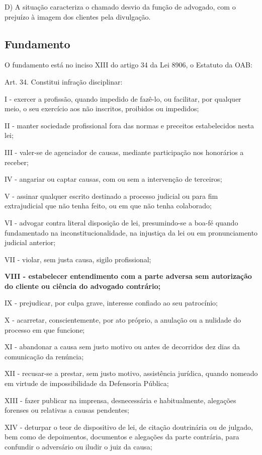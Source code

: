 \documentclass[12pt]{article}
\begin{document}
D) A situação caracteriza o chamado desvio da função de 
advogado, com o prejuízo à imagem dos clientes pela 
divulgação. 

\subsection{Fundamento}

O fundamento está no inciso XIII do artigo 34 da Lei 8906, o Estatuto da OAB:

Art. 34. Constitui infração disciplinar:

I - exercer a profissão, quando impedido de fazê-lo, ou facilitar, por qualquer meio, o seu exercício aos não inscritos, proibidos ou impedidos;

II - manter sociedade profissional fora das normas e preceitos estabelecidos nesta lei;

III - valer-se de agenciador de causas, mediante participação nos honorários a receber;

IV - angariar ou captar causas, com ou sem a intervenção de terceiros;

V - assinar qualquer escrito destinado a processo judicial ou para fim extrajudicial que não tenha feito, ou em que não tenha     colaborado;

VI - advogar contra literal disposição de lei, presumindo-se a boa-fé quando fundamentado na inconstitucionalidade, na injustiça da lei ou em pronunciamento judicial anterior;

VII - violar, sem justa causa, sigilo profissional;

\textbf{VIII - estabelecer entendimento com a parte adversa sem autorização do cliente ou ciência do advogado contrário;}

IX - prejudicar, por culpa grave, interesse confiado ao seu patrocínio;

X - acarretar, conscientemente, por ato próprio, a anulação ou a nulidade do processo em que funcione;

XI - abandonar a causa sem justo motivo ou antes de decorridos dez dias da comunicação da renúncia;

XII - recusar-se a prestar, sem justo motivo, assistência jurídica, quando nomeado em virtude de impossibilidade da Defensoria Pública;

XIII - fazer publicar na imprensa, desnecessária e habitualmente, alegações forenses ou relativas a causas pendentes;

XIV - deturpar o teor de dispositivo de lei, de citação doutrinária ou de julgado, bem como de depoimentos, documentos e alegações da parte contrária, para confundir o adversário ou iludir o juiz da causa;
\end{document}
